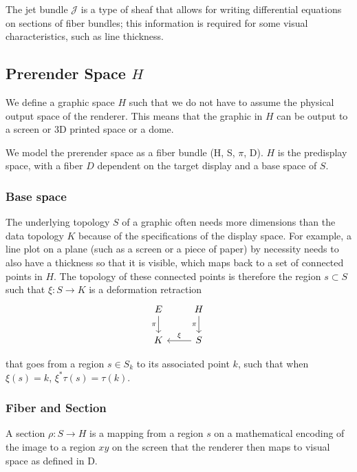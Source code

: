\documentclass[../main.tex]{subfiles}
\begin{document}
The jet bundle $\mathcal{J}$ \cite{JetBundle2020,musilovaCalculusVariationsJet2016} is a type of sheaf that allows for writing differential equations on sections of fiber bundles; this information is required for some visual characteristics, such as line thickness. 


\subsection{Prerender Space $H$}
\label{sec:display}
We define a graphic space $H$ such that we do not have to assume the physical output space of the renderer. This means that the graphic in $H$ can be output to a screen or 3D printed space or a dome. 

We model the prerender space as a fiber bundle (H, S, $\pi$, D). $H$ is the predisplay space, with a fiber $D$ dependent on the target display and a base space of $S$. 

\subsubsection{Base space}
The underlying topology $S$ of a graphic often needs more dimensions than the data topology $K$ because of the specifications of the display space. For example, a line plot on a plane (such as a screen or a piece of paper) by necessity needs to also have a thickness so that it is visible, which maps back to a set of connected points in $H$. The topology of these connected points is therefore the region $s \subset S$ such that $\xi: S \rightarrow K$ is a deformation retraction \cite{RetractionTopology2020}
\begin{equation}
    \begin{tikzcd}
        E \arrow[d, "\pi"'] & H \arrow[d, "\pi"'] \\
        K                   & S \arrow[l, "\xi"']
        \end{tikzcd}
\end{equation}

that goes from a region $s \in S_{k}$ to its associated point $k$, such that when $\xi(s) = k$, $\xi^*\tau(s) = \tau(k)$. 

\subsubsection{Fiber and Section}
A section $\rho: S \rightarrow H$ is a mapping from a region $s$ on a mathematical encoding of the image to a region $xy$ on the screen that the renderer then maps to visual space as defined in D.
\end{document}
